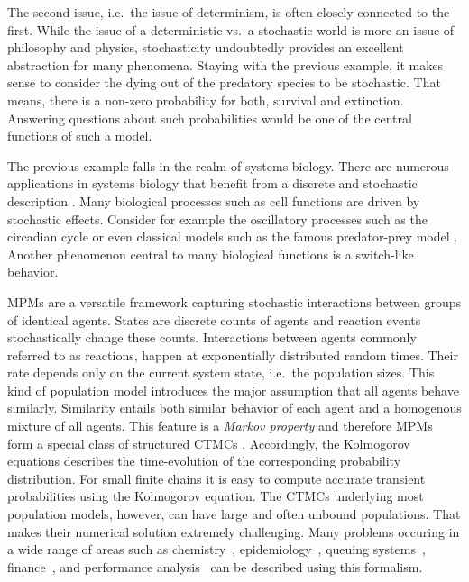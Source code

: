 The second issue, i.e.\ the issue of determinism, is often closely connected to the first.
While the issue of a deterministic vs.\ a stochastic world is more an issue of philosophy and physics, stochasticity undoubtedly provides an excellent abstraction for many phenomena.
Staying with the previous example, it makes sense to consider the dying out of the predatory species to be stochastic.
That means, there is a non-zero probability for both, survival and extinction.
Answering questions about such probabilities would be one of the central functions of such a model.

The previous example falls in the realm of systems biology.
There are numerous applications in systems biology that benefit from a discrete and stochastic description \parencite{wilkinson2018stochastic,BuchWolkenhauer}.
Many biological processes such as cell functions are driven by stochastic effects.
Consider for example the oscillatory processes such as the circadian cycle \parencite{asgari2019mathematical} or even classical models such as the famous predator-prey model \parencite{lotka1925elements}.
Another phenomenon central to many biological functions is a switch-like behavior.


\Acfp{MPM} are a versatile framework capturing stochastic interactions between groups of identical agents.
States are discrete counts of agents and reaction events stochastically change these counts.
Interactions between agents commonly referred to as reactions, happen at exponentially distributed random times. 
Their rate depends only on the current system state, i.e.\ the population sizes.
This kind of population model introduces the major assumption that all agents behave similarly.
Similarity entails both similar behavior of each agent and a homogenous mixture of all agents.
This feature is a \emph{Markov property} and
therefore \acp{MPM} form a special class of structured \acp{CTMC} \parencite{anderson2012continuous}.
Accordingly, the Kolmogorov equations describes the time-evolution of the corresponding probability distribution.
For small finite chains it is easy to compute accurate transient probabilities using the Kolmogorov equation.
The \acp{CTMC} underlying most population models, however, can have large and often unbound populations.
That makes their numerical solution extremely challenging.
Many problems occuring in a wide range of areas such as chemistry~\parencite{gillespie1977exact}, epidemiology~\parencite{mode2000stochastic},    queuing systems~\parencite{breuer2003markov}, finance~\parencite{pardoux2008markov}, and performance analysis~\parencite{bortolussi2013continuous,gast2019} can be described using this formalism.

